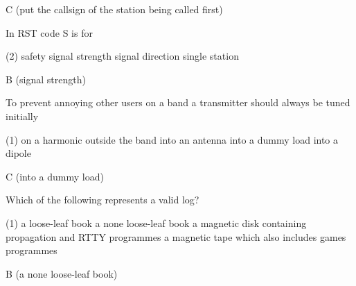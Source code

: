 \documentclass[a4paper]{article}
\begin{document}
\begin{solution}
	C (put the callsign of the station being called first)
\end{solution}

\vspace{5mm}



\begin{question}In RST code \apostrophe{}S\apostrophe{} is for
	\begin{tasks}(2)
		\task safety
		\task signal strength
		\task signal direction
		\task single station
	\end{tasks}
\end{question}

\begin{solution}
	B (signal strength)
\end{solution}

\vspace{5mm}



\begin{question}To prevent annoying other users on a band a transmitter should always be tuned initially
	\begin{tasks}(1)
		\task on a harmonic outside the band
		\task into an antenna
		\task into a dummy load
		\task into a dipole
	\end{tasks}
\end{question}

\begin{solution}
	C (into a dummy load)
\end{solution}

\vspace{5mm}



\begin{question}Which of the following represents a valid log?
	\begin{tasks}(1)
		\task a loose-leaf book
		\task a none loose-leaf book
		\task a magnetic disk containing propagation and RTTY programmes
		\task a magnetic tape which also includes games programmes
	\end{tasks}
\end{question}

\begin{solution}
	B (a none loose-leaf book)
\end{solution}

\vspace{5mm}
\end{document}
